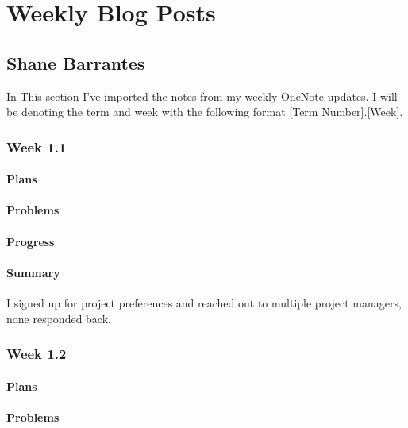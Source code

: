 \documentclass[onecolumn, draftclsnofoot,10pt, compsoc]{article}
\begin{document}
\section{Weekly Blog Posts}
    \subsection{Shane Barrantes}
        In This section I've imported the notes from my weekly OneNote updates. I will be denoting the term and week with the following format [Term Number].[Week].

        \subsubsection{Week 1.1}

		    \paragraph{Plans} \hfill \break

		    \paragraph{Problems} \hfill \break

		    \paragraph{Progress} \hfill \break

		    \paragraph{Summary} \hfill \break
		         I signed up for project preferences and reached out to multiple project managers, none responded back. \\

		\subsubsection{Week 1.2}

		    \paragraph{Plans} \hfill \break

		    \paragraph{Problems} \hfill \break
\end{document}
